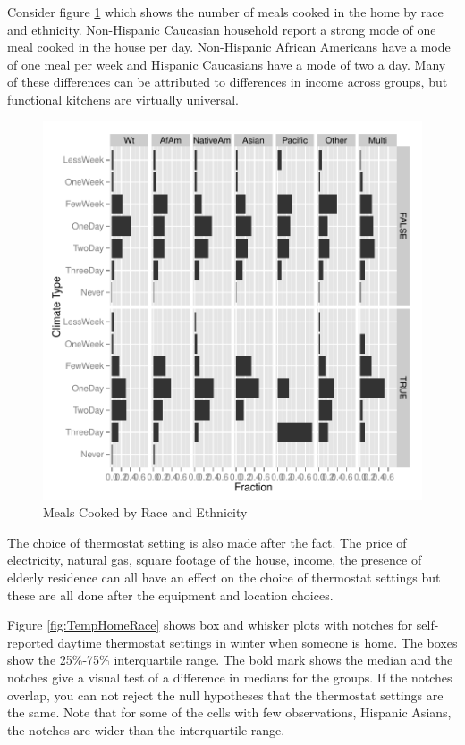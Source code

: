 \documentclass{article}
\begin{document}
Consider figure \ref{fig:Meals} which shows the number of meals cooked in the home by race and ethnicity.  Non-Hispanic Caucasian household report a strong mode of one meal cooked in the house per day.  Non-Hispanic African Americans have a mode of one meal per week and Hispanic Caucasians have a mode of two a day.  Many of these differences can be attributed to differences in income across groups, but functional kitchens are virtually universal.


\begin{figure}
\begin{center}
\caption{Meals Cooked by Race and Ethnicity}
\label{fig:Meals}
\includegraphics{DraftEdwardsWoods-011}
\end{center}
\end{figure}


The choice of thermostat setting is also made after the fact. The price of electricity, natural gas, square footage of the house, income, the presence of elderly residence can all have an effect on the choice of thermostat settings but these are all done after the equipment and location choices.  

Figure \ref{fig:TempHomeRace} shows box and whisker plots with notches for self-reported daytime thermostat settings in winter when someone is home.  The boxes show the 25\%-75\% interquartile range.  The bold mark shows the median and the notches give a visual test of a difference in medians for the groups.  If the notches overlap, you can not reject the null hypotheses that the thermostat settings are the same.  Note that for some of the cells with few observations, Hispanic Asians, the notches are wider than the interquartile range.
\end{document}
